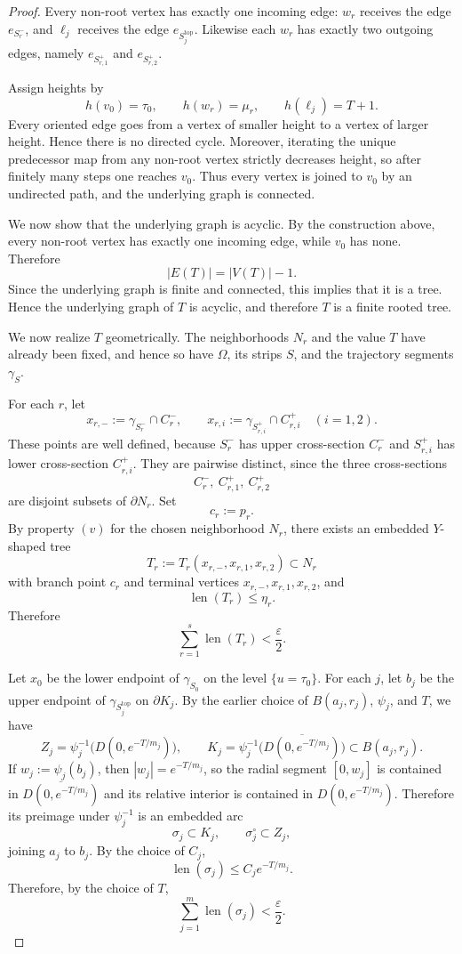 \documentclass[12pt]{amsart}
\theoremstyle{definition}
\theoremstyle{remark}
\begin{document}
\begin{proof}
Every non-root vertex has exactly one incoming edge:
$w_r$ receives the edge $e_{S_r^-}$, and $\ell_j$ receives the edge
$e_{S_j^{\mathrm{top}}}$.
Likewise each $w_r$ has exactly two outgoing edges, namely
$e_{S_{r,1}^+}$ and $e_{S_{r,2}^+}$.

Assign heights by
\[
h(v_0)=\tau_0,\qquad h(w_r)=\mu_r,\qquad h(\ell_j)=T+1.
\]
Every oriented edge goes from a vertex of smaller height to a vertex of larger height.
Hence there is no directed cycle. Moreover, iterating the unique predecessor map from
any non-root vertex strictly decreases height, so after finitely many steps one reaches
$v_0$. Thus every vertex is joined to $v_0$ by an undirected path, and the underlying
graph is connected.

We now show that the underlying graph is acyclic. By the construction above, every
non-root vertex has exactly one incoming edge, while $v_0$ has none. Therefore
\[
|E(T)| = |V(T)| - 1.
\]
Since the underlying graph is finite and connected, this implies that it is a tree. Hence
the underlying graph of $T$ is acyclic, and therefore $T$ is a finite rooted tree.

We now realize \(T\) geometrically. The neighborhoods \(N_r\) and the value \(T\) have already been fixed, and hence so have \(\Omega\), its strips \(S\), and the trajectory segments \(\gamma_S\).

For each \(r\), let
\[
x_{r,-}:=\gamma_{S_r^-}\cap C_r^-,
\qquad
x_{r,i}:=\gamma_{S_{r,i}^+}\cap C_{r,i}^+
\quad (i=1,2).
\]
These points are well defined, because \(S_r^-\) has upper cross-section \(C_r^-\) and \(S_{r,i}^+\) has lower cross-section \(C_{r,i}^+\). They are pairwise distinct, since the three cross-sections
\[
C_r^-,\ C_{r,1}^+,\ C_{r,2}^+
\]
are disjoint subsets of \(\partial N_r\). Set
\[
c_r:=p_r.
\]
By property \((v)\) for the chosen neighborhood $N_r$, there exists an embedded \(Y\)-shaped tree
\[
T_r:=T_r(x_{r,-},x_{r,1},x_{r,2})\subset N_r
\]
with branch point \(c_r\) and terminal vertices \(x_{r,-},x_{r,1},x_{r,2}\), and
\[
\operatorname{len}(T_r)\le \eta_r.
\]
Therefore
\[
\sum_{r=1}^s \operatorname{len}(T_r)<\frac{\varepsilon}{2}. \tag{12}
\]

Let \(x_0\) be the lower endpoint of \(\gamma_{S_0}\) on the level \(\{u=\tau_0\}\). For each \(j\), let \(b_j\) be the upper endpoint of \(\gamma_{S_j^{\mathrm{top}}}\) on \(\partial K_j\). By the earlier choice of $B(a_j,r_j)$, $\psi_j$, and $T$, we have
\[
Z_j=\psi_j^{-1}\bigl(D(0,e^{-T/m_j})\bigr),
\qquad
K_j=\psi_j^{-1}\bigl(\overline{D(0,e^{-T/m_j})}\bigr)\subset B(a_j,r_j).
\]
If $w_j:=\psi_j(b_j)$, then $|w_j|=e^{-T/m_j}$, so the radial segment $[0,w_j]$
is contained in $\overline{D(0,e^{-T/m_j})}$ and its relative interior is contained in
$D(0,e^{-T/m_j})$. Therefore its preimage under $\psi_j^{-1}$ is an embedded arc
\[
\sigma_j\subset K_j,\qquad \sigma_j^\circ\subset Z_j,
\]
joining $a_j$ to $b_j$. By the choice of $C_j$,
\[
\operatorname{len}(\sigma_j)\le C_j e^{-T/m_j}.
\]
Therefore, by the choice of $T$,
\[
\sum_{j=1}^m \operatorname{len}(\sigma_j)<\frac{\varepsilon}{2}. \tag{13}
\]


\end{proof}
\end{document}
